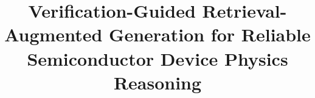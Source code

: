\documentclass[a4paper,fleqn]{cas-sc}
\begin{document}
\let\WriteBookmarks\relax
\def\floatpagepagefraction{1}
\def\textpagefraction{.001}


\title[mode=title]{Verification-Guided Retrieval-Augmented Generation for Reliable Semiconductor Device Physics Reasoning}










\end{document}
